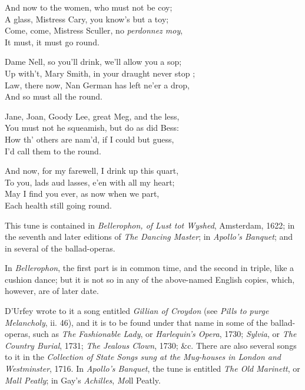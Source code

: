 \begin{dcverse}
\begin{patverse}
And now to the women, who must not be coy;\\
A glass, Mistress Cary, you know’s but a toy;\\
Come, come, Mistress Sculler, no \textit{perdonnez moy},\\
It must, it must go round.
\end{patverse}

\begin{patverse}
Dame Nell, so you’ll drink, we’ll allow you a sop;\\
Up with’t, Mary Smith, in your draught never stop ;\\
Law, there now, Nan German has left ne’er a drop,\\
And so must all the round.
\end{patverse}

\begin{patverse}
Jane, Joan, Goody Lee, great Meg, and the less,\\
You must not he squeamish, but do as did Bess:\\
How th’ others are nam’d, if I could but guess,\\
I’d call them to the round.
\end{patverse}
\end{dcverse}

\settowidth{\versewidth}{And now, for my farewell, I drink up this quart,}
\begin{scverse}And now, for my farewell, I drink up this quart,\\
To you, lads aud lasses, e’en with all my heart;\\
May I find you ever, as now when we part,\\
\vin Each health still going round.
\end{scverse}


This tune is contained in \textit{Bellerophon, of Lust tot Wyshed}, Amsterdam, 1622;
in the seventh and later editions of \textit{The Dancing Master}; in \textit{Apollo's Banquet};
and in several of the ballad-operas.

In \textit{Bellerophon}, the first part is in common time, and the second in triple, like
a cushion dance; but it is not so in any of the above-named English copies,
which, however, are of later date.

D’Urfey wrote to it a song entitled \textit{Gillian of Croydon} (see \textit{Pills to purge
Melancholy}, ii. 46), and it is to be found under that name in some of the ballad-operas, 
such as \textit{The Fashionable Lady}, or \textit{Harlequin's Opera}, 1730; \textit{Sylvia}, or
\textit{The Country Burial}, 1731; \textit{The Jealous Clown}, 1730; \&c. There are also several
songs to it in the \textit{Collection of State Songs sung at the Mug-houses in London and
Westminster}, 1716. In \textit{Apollo’s Banquet}, the tune is entitled \textit{The Old Marinett},
or \textit{Mall Peatly}; in Gay’s \textit{Achilles}, \textit{Mo}ll Peatly.

